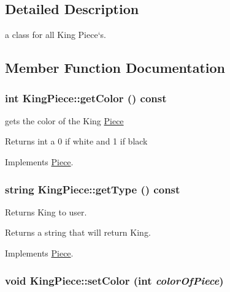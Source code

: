 \subsection{Detailed Description}
a class for all King Piece`s. 

\subsection{Member Function Documentation}
\hypertarget{classKingPiece_ac15e38c6ceaccae6879ec70211c2ab28}{
\subsubsection[{getColor}]{\setlength{\rightskip}{0pt plus 5cm}int KingPiece::getColor () const}}
\label{classKingPiece_ac15e38c6ceaccae6879ec70211c2ab28}


gets the color of the King \hyperlink{classPiece}{Piece} \begin{DoxyReturn}{Returns}
int a 0 if white and 1 if black 
\end{DoxyReturn}


Implements \hyperlink{classPiece_a1376072d4815719e60253ce5688df95c}{Piece}.\hypertarget{classKingPiece_ac93de53a7adee6e5ad33284f0fd6aa2e}{
\subsubsection[{getType}]{\setlength{\rightskip}{0pt plus 5cm}string KingPiece::getType () const}}
\label{classKingPiece_ac93de53a7adee6e5ad33284f0fd6aa2e}


Returns King to user. \begin{DoxyReturn}{Returns}
a string that will return King. 
\end{DoxyReturn}


Implements \hyperlink{classPiece_a5b88fcd786bb30b345b24fbc3ab24ab9}{Piece}.\hypertarget{classKingPiece_ab7a9023dda46c21a566675623f1b4a32}{
\subsubsection[{setColor}]{\setlength{\rightskip}{0pt plus 5cm}void KingPiece::setColor (int {\em colorOfPiece})}}
\label{classKingPiece_ab7a9023dda46c21a566675623f1b4a32}


